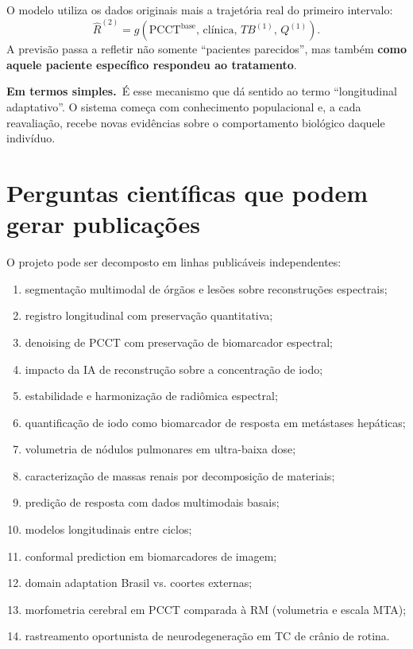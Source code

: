 \documentclass[11pt,a4paper]{article}
\newcommand{\simples}{\textcolor{titleblue}{\textbf{Em termos simples.}}\ }
\begin{document}
O modelo utiliza os dados originais mais a trajetória real do primeiro intervalo:
\begin{equation}
\widehat{R}^{(2)} = g(\text{PCCT}^{\text{base}},\, \text{clínica},\, TB^{(1)},\, Q^{(1)}).
\end{equation}
A previsão passa a refletir não somente ``pacientes parecidos'', mas também \textbf{como aquele paciente específico respondeu ao tratamento}.

\begin{caixa}
\simples É esse mecanismo que dá sentido ao termo ``longitudinal adaptativo''. O sistema começa com conhecimento populacional e, a cada reavaliação, recebe novas evidências sobre o comportamento biológico daquele indivíduo.
\end{caixa}

\section{Perguntas científicas que podem gerar publicações}

O projeto pode ser decomposto em linhas publicáveis independentes:

\begin{enumerate}
\item segmentação multimodal de órgãos e lesões sobre reconstruções espectrais;
\item registro longitudinal com preservação quantitativa;
\item denoising de PCCT com preservação de biomarcador espectral;
\item impacto da IA de reconstrução sobre a concentração de iodo;
\item estabilidade e harmonização de radiômica espectral;
\item quantificação de iodo como biomarcador de resposta em metástases hepáticas;
\item volumetria de nódulos pulmonares em ultra-baixa dose;
\item caracterização de massas renais por decomposição de materiais;
\item predição de resposta com dados multimodais basais;
\item modelos longitudinais entre ciclos;
\item conformal prediction em biomarcadores de imagem;
\item domain adaptation Brasil vs. coortes externas;
\item morfometria cerebral em PCCT comparada à RM (volumetria e escala MTA);
\item rastreamento oportunista de neurodegeneração em TC de crânio de rotina.
\end{enumerate}
\end{document}
